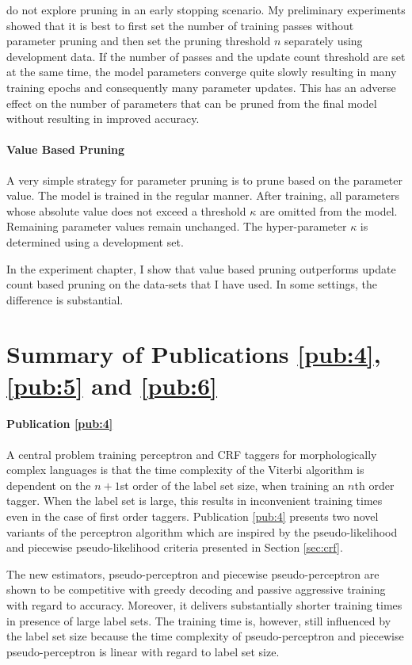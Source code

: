 \cite{Goldberg2011} do not explore pruning in an early stopping
scenario. My preliminary experiments showed that it is best to first
set the number of training passes without parameter pruning and then
set the pruning threshold $n$ separately using development data. If the
number of passes and the update count threshold are set at the same
time, the model parameters converge quite slowly resulting in many
training epochs and consequently many parameter updates. This has an
adverse effect on the number of parameters that can be pruned from the
final model without resulting in improved accuracy.

\paragraph{Value Based Pruning} A very simple strategy for
parameter pruning is to prune based on the parameter value. The model
is trained in the regular manner. After training, all parameters whose
absolute value does not exceed a threshold $\kappa$ are omitted from
the model. Remaining parameter values remain unchanged. The
hyper-parameter $\kappa$ is determined using a development set.

In the experiment chapter, I show that value based pruning outperforms
update count based pruning on the data-sets that I have used. In some
settings, the difference is substantial.

\section{Summary of Publications \ref{pub:4}, \ref{pub:5} and \ref{pub:6}}

\paragraph{Publication \ref{pub:4}} A central problem training
perceptron and CRF taggers for morphologically complex languages is that
the time complexity of the Viterbi algorithm is dependent on the
$n+1$st order of the label set size, when training an $n$th order
tagger. When the label set is large, this results in inconvenient
training times even in the case of first order taggers. Publication
\ref{pub:4} presents two novel variants of the perceptron algorithm
which are inspired by the pseudo-likelihood and piecewise
pseudo-likelihood criteria presented in Section \ref{sec:crf}.

The new estimators, pseudo-perceptron and piecewise pseudo-perceptron
are shown to be competitive with greedy decoding and passive
aggressive training with regard to accuracy. Moreover, it delivers
substantially shorter training times in presence of large label
sets. The training time is, however, still influenced by the label set
size because the time complexity of pseudo-perceptron and piecewise
pseudo-perceptron is linear with regard to label set size.

